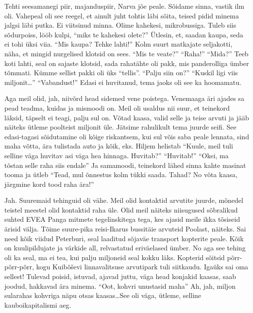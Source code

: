 
Tehti seesamanegi piir, majanduspiir, Narva jõe peale. Sõidame sinna, vastik ilm oli. Vahepeal oli see reegel, et ainult juht tohtis läbi sõita, teised pidid minema jalgsi läbi putka. Ei viitsinud minna. Olime kahekesi, mikrobussiga. Tuleb siis sõdurpoiss, lööb kulpi, \enquote{miks te kahekesi olete?} Ütlesin, et, saadan kaupa, seda ei tohi üksi viia. \enquote{Mis kaupa? Tehke lahti!} Kolm suurt matkajate seljakotti, näha, et mingid nurgelised klotsid on sees. \enquote{Mis te veate?} \enquote{Raha!} \enquote{Mida?} Teeb koti lahti, seal on sajaste klotsid, sada rahatähte oli pakk, mis panderolliga ümber tõmmati. Kümme sellist pakki oli üks \enquote{tellis}. \enquote{Palju siin on?} \enquote{Kuskil ligi viis miljonit\ldots} \enquote{Vabandust!} Edasi ei huvitanud, tema jaoks oli see ka hoomamatu. 

Aga meil olid, jah, niivõrd head sidemed vene poistega. Venemaaga äri ajades sa pead teadma, kuidas ja mismoodi on. Meil oli usaldus nii suur, et teinekord läksid,  täpselt ei teagi, palju sul on. Võtad kaasa, valid selle ja teise arvuti ja jääb näiteks ütleme poolteist miljonit üle. Jätsime rahulikult tema juurde seifi. See edasi-tagasi sõidutamine oli kõige riskantsem, kui sul võis saba peale lennata, sind maha võtta, ära tulistada auto ja kõik, eks. Hiljem helistab \enquote{Kuule, meil tuli selline väga huvitav asi väga hea hinnaga. Huvitab?} \enquote{Huvitab!} \enquote{Okei, ma tõstan selle raha siis endale} Ja samamoodi, teinekord lähed sinna kahte masinat tooma ja ütleb \enquote{Tead, mul õnnestus kolm tükki saada. Tahad? No võta kaasa, järgmine kord tood raha ära!} 


Jah. Suuremaid tehinguid oli vähe. Meil olid kontaktid arvutite juurde, mõnedel teistel meestel olid kontaktid raha üle. Olid meil näiteks niisugused sõbralikud suhted EVEA Panga mitmete tegelinskitega tega, kes ajasid meile ikka tõsiseid ärisid välja. Tõime suure-pika reisi-Ikarus bussitäie arvuteid Poolast, näiteks. Sai need kõik viidud Peterburi, seal laaditud sõjaväe transport kopterite peale. Kõik on kuulipildujate ja värkide all, relvastatud eriväelased ümber. No aga see tehing oli ka seal, ma ei tea, kui palju miljoneid seal kokku läks. Kopterid sõitsid põrr-põrr-põrr, kogu Kuibõševi linnavalitsuse arvutipark tuli siitkaudu. Igaüks sai oma sellest! Tulevad poisid, istuvad, ajavad juttu, väga head konjakid kaasas, saab joodud, hakkavad ära minema. \enquote{Oot, kohvri unustasid maha} Ah, jah, miljon sularahas kohvriga näpu otsas kaasas\ldots See oli väga, ütleme, selline kauboikapitalismi aeg. 

